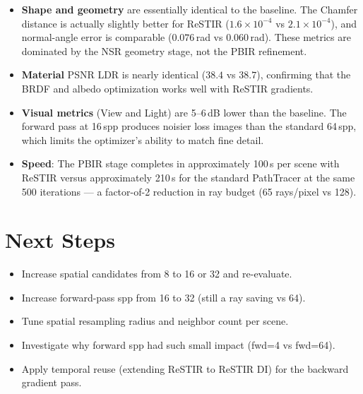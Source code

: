 \begin{itemize}
    \item \textbf{Shape and geometry} are essentially identical to the baseline.
    The Chamfer distance is actually slightly better for ReSTIR ($1.6\times10^{-4}$
    vs $2.1\times10^{-4}$), and normal-angle error is comparable
    ($0.076$\,rad vs $0.060$\,rad). These metrics are dominated by the NSR
    geometry stage, not the PBIR refinement.

    \item \textbf{Material} PSNR LDR is nearly identical ($38.4$ vs $38.7$),
    confirming that the BRDF and albedo optimization works well with ReSTIR
    gradients.

    \item \textbf{Visual metrics} (View and Light) are 5--6\,dB lower than the
    baseline. The forward pass at 16\,spp produces noisier loss images than the
    standard 64\,spp, which limits the optimizer's ability to match fine detail.

    \item \textbf{Speed}: The PBIR stage completes in approximately 100\,s per
    scene with ReSTIR versus approximately 210\,s for the standard PathTracer at
    the same 500 iterations --- a factor-of-2 reduction in ray budget (65
    rays/pixel vs 128).
\end{itemize}

\section{Next Steps}

\begin{itemize}
    \item Increase spatial candidates from 8 to 16 or 32 and re-evaluate.
    \item Increase forward-pass spp from 16 to 32 (still a ray saving vs 64).
    \item Tune spatial resampling radius and neighbor count per scene.
    \item Investigate why forward spp had such small impact (fwd=4 vs fwd=64).
    \item Apply temporal reuse (extending ReSTIR to ReSTIR DI) for the backward
    gradient pass.
\end{itemize}

